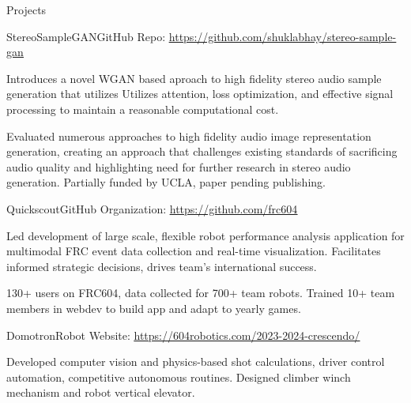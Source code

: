 \documentclass[
  10pt, %
]{resume} %
\begin{document}

\begin{rSection}{Projects}

  
  \begin{rSubsection}{StereoSampleGAN}{}{GitHub Repo: \underline{\href{https://github.com/shuklabhay/stereo-sample-gan}{https://github.com/shuklabhay/stereo-sample-gan}}}{}
       
    \item Introduces a novel WGAN based aproach to high fidelity stereo audio sample generation that utilizes Utilizes attention, loss optimization, and effective signal processing to maintain a reasonable computational cost.
        
    \item Evaluated numerous approaches to high fidelity audio image representation generation, creating an approach that challenges existing standards of sacrificing audio quality and highlighting need for further research in stereo audio generation. Partially funded by UCLA, paper pending publishing.
        
  \end{rSubsection}
      
  \begin{rSubsection}{Quickscout}{}{GitHub Organization: \underline{\href{https://github.com/frc604}{https://github.com/frc604}}}{}
       
    \item Led development of large scale, flexible robot performance analysis application for multimodal FRC event data collection and real-time visualization. Facilitates informed strategic decisions, drives team's international success.
        
    \item 130+ users on FRC604, data collected for 700+ team robots. Trained 10+ team members in webdev to build app and adapt to yearly games.
        
  \end{rSubsection}
      
  \begin{rSubsection}{Domotron}{}{Robot Website: \underline{\href{https://604robotics.com/2023-2024-crescendo/}{https://604robotics.com/2023-2024-crescendo/}}}{}
       
    \item Developed computer vision and physics-based shot calculations, driver control automation, competitive autonomous routines. Designed climber winch mechanism and robot vertical elevator.
        
  \end{rSubsection}
      
	
\end{rSection}
    
\end{document}
